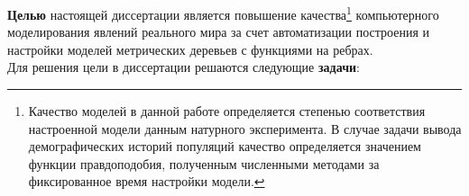 

\textbf{Целью} настоящей диссертации является повышение качества\footnote{Качество моделей в данной работе определяется степенью соответствия настроенной модели данным натурного эксперимента. В случае задачи вывода демографических историй популяций качество определяется значением функции правдоподобия, полученным численными методами за фиксированное время настройки модели.}
компьютерного моделирования явлений реального мира за счет автоматизации построения и настройки моделей метрических деревьев с функциями на ребрах.\\

Для решения цели в диссертации решаются следующие \textbf{задачи}:

